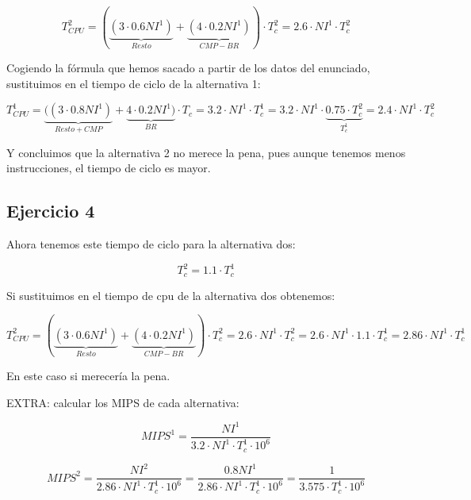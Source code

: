 \documentclass[10pt,a4paper,spanish]{report}
\begin{document}
\begin{displaymath}
T_{CPU}^2 = (\underbrace{(3 \cdot 0.6NI^1)}_{Resto} + \underbrace{(4 \cdot 0.2NI^1)}_{CMP-BR}) \cdot T_c^2 = 2.6 \cdot NI^1 \cdot T_c^2 
\end{displaymath}

Cogiendo la fórmula que hemos sacado a partir de los datos del enunciado, sustituimos en el tiempo de ciclo de la alternativa 1:

\begin{displaymath}
T_{CPU}^1 = \underbrace{((3 \cdot 0.8NI^1)}_{Resto+CMP} + \underbrace{4 \cdot 0.2NI^1)}_{BR} \cdot T_c = 3.2 \cdot NI^1 \cdot T_c^1 = 3.2 \cdot NI^1 \cdot \underbrace{0.75 \cdot T_c^2}_{T_c^1} = 2.4 \cdot NI^1 \cdot T_c^2
\end{displaymath}

Y concluimos que la alternativa 2 no merece la pena, pues aunque tenemos menos instrucciones, el tiempo de ciclo es mayor.

\textcolor[rgb]{0.2,0.4,0.8}{\subsection{Ejercicio 4}}

Ahora tenemos este tiempo de ciclo para la alternativa dos:

\begin{displaymath}
T_c^2 = 1.1 \cdot T_c^1
\end{displaymath}

Si sustituimos en el tiempo de cpu de la alternativa dos obtenemos:

\begin{displaymath}
T_{CPU}^2 = (\underbrace{(3 \cdot 0.6NI^1)}_{Resto} + \underbrace{(4 \cdot 0.2NI^1)}_{CMP-BR}) \cdot T_c^2 = 2.6 \cdot NI^1 \cdot T_c^2 = 2.6 \cdot NI^1 \cdot 1.1 \cdot T_c^1 = 2.86 \cdot NI^1 \cdot T_c^1
\end{displaymath}

En este caso si merecería la pena.

EXTRA: calcular los MIPS de cada alternativa:

\begin{displaymath}
MIPS^1 = \frac{NI^1}{3.2\cdot NI^1 \cdot T_c^1 \cdot 10^6}
\end{displaymath}

\begin{displaymath}
MIPS^2 = \frac{NI^2}{2.86 \cdot NI^1 \cdot T_c^1 \cdot 10^6} = \frac{0.8NI^1}{2.86 \cdot NI^1 \cdot T_c^1 \cdot 10^6} = \frac{1}{3.575 \cdot T_c^1 \cdot 10^6}
\end{displaymath}
\end{document}
